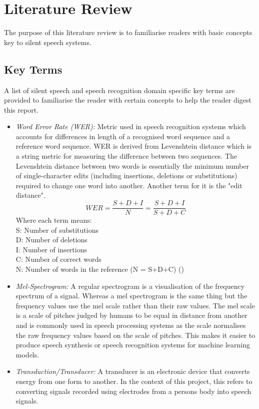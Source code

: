 \chapter{Literature Review} \label{chap:lit-review}

The purpose of this literature review is to familiarise readers with
basic concepts key to silent speech systems.

\section{Key Terms}

A list of silent speech and speech recognition domain specific key terms are provided
to familiarise the reader with certain concepts to help the reader digest this report.

\begin{itemize}
\item \emph{Word Error Rate (WER):}
Metric used in speech recognition systems which accounts for differences in length of
a recognised word sequence and a reference word sequence. WER is derived from
Levenshtein distance  which is a string metric for measuring the difference between two
sequences. The Levenshtein distance between two words is essentially the minimum number of
single-character edits (including insertions, deletions or substitutions) required to
change one word into another. Another term for it is the "edit distance".
\[
  WER
  = \dfrac{S + D + I}{N}
  = \dfrac{S + D + I}{S + D + C}
\]
Where each term means:\\
S: Number of substitutions\\
D: Number of deletions\\
I: Number of insertions\\
C: Number of correct words\\
N: Number of words in the reference (N = S+D+C)
(\cite{1966SPhD...10..707L})
\item \emph{Mel-Spectrogram:}
A regular spectrogram is a visualisation of the frequency spectrum
of a signal. Whereas a mel spectrogram is the same thing but the frequency
values use the mel scale rather than their raw values. The mel scale
is a scale of pitches judged by humans to be equal in distance from another
and is commonly used in speech processing systems as the scale normalises
the raw frequency values based on the scale of pitches. This makes it easier
to produce speech synthesis or speech recognition systems for machine
learning models.
\item \emph{Transduction/Transducer:}
A transducer is an electronic device that converts energy from one form
to another. In the context of this project, this refers to converting
signals recorded using electrodes from a persons body into speech signals.
\end{itemize}

